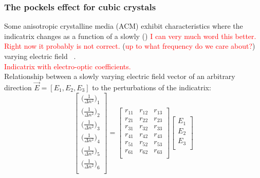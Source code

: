 \subsubsection{The pockels effect for cubic crystals}
Some anisotropic crystalline media (ACM) exhibit characteristics where the indicatrix changes as a function of a slowly () \textcolor{red}{I can very much word this better. Right now it probably is not correct.} (\textcolor{red}{up to what frequency do we care about?}) varying electric field ~\cite{yariv,nye}.
\\
\textcolor{red}{Indicatrix with electro-optic coefficients.}
\\
Relationship between a slowly varying electric field vector of an arbitrary direction $\vec{E} = [E_1, E_2, E_3]$ to the perturbations of the indicatrix:
\\
\begin{equation}
  \left[ {\begin{array}{c}
   \big( \frac{1}{\Delta n ^2 } \big)_1 \\
   \big( \frac{1}{\Delta n ^2 } \big)_2 \\
   \big( \frac{1}{\Delta n ^2 } \big)_3 \\
   \big( \frac{1}{\Delta n ^2 } \big)_4 \\
   \big( \frac{1}{\Delta n ^2 } \big)_5 \\
   \big( \frac{1}{\Delta n ^2 } \big)_6 \\

  \end{array} } \right]
  =
%
 \left[ {\begin{array}{ccc}
   r_{11} & r_{12} & r_{13}\\
   r_{21} & r_{22} & r_{23}\\
   r_{31} & r_{32} & r_{33}\\
   r_{41} & r_{42} & r_{43}\\
   r_{51} & r_{52} & r_{53}\\
   r_{61} & r_{62} & r_{63}\\
  \end{array}} \right]
 \left[{\begin{array}{c}
   E_1\\
   E_2\\
   E_3\\
 \end{array}} \right]
\end{equation}

